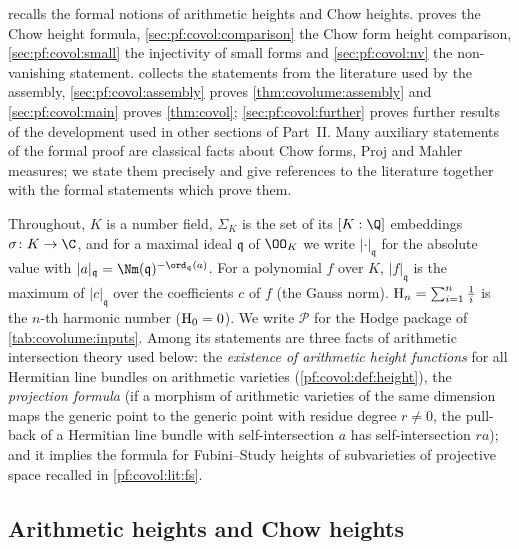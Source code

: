  recalls the formal notions of arithmetic heights and Chow heights.
 proves the Chow height formula, \cref{sec:pf:covol:comparison} the Chow form
height comparison, \cref{sec:pf:covol:small} the injectivity of small forms and \cref{sec:pf:covol:nv}
the non-vanishing statement.  collects the statements from the literature
used by the assembly, \cref{sec:pf:covol:assembly} proves \cref{thm:covolume:assembly} and
\cref{sec:pf:covol:main} proves \cref{thm:covol}; \cref{sec:pf:covol:further} proves further results of the
development used in other sections of Part~II. Many auxiliary statements of the formal proof are
classical facts about Chow forms, $\mathrm{Proj}$ and Mahler measures; we state them precisely and give
references to the literature together with the formal statements which prove them.

Throughout, $K$ is a number field, $\Sigma_K$ is the set of its $[K:\Q]$ embeddings $\sigma\colon K\to\C$,
and for a maximal ideal $\mathfrak q$ of $\OO_K$ we write $|\cdot|_{\mathfrak q}$ for the absolute value
with $|a|_{\mathfrak q}=\Nm(\mathfrak q)^{-\ord_{\mathfrak q}(a)}$. For a polynomial $f$ over $K$,
$|f|_{\mathfrak q}$ is the maximum of $|c|_{\mathfrak q}$ over the coefficients $c$ of $f$ (the Gauss
norm). $\mathrm{H}_n=\sum_{i=1}^n\frac1i$ is the $n$-th harmonic number ($\mathrm{H}_0=0$). We write
$\mathcal P$ for the Hodge package of \cref{tab:covolume:inputs}. Among its statements are three facts
of arithmetic intersection theory used below: the \emph{existence of arithmetic height functions} for
all Hermitian line bundles on arithmetic varieties (\cref{pf:covol:def:height}), the \emph{projection
formula} (if a morphism of arithmetic varieties of the same dimension maps the generic point to the
generic point with residue degree $r\ne0$, the pull-back of a Hermitian line bundle with
self-intersection $a$ has self-intersection $ra$); and it implies the formula for Fubini--Study heights of
subvarieties of projective space recalled in \cref{pf:covol:lit:fs}.

\subsection{Arithmetic heights and Chow heights}\label{sec:pf:covol:heights}


